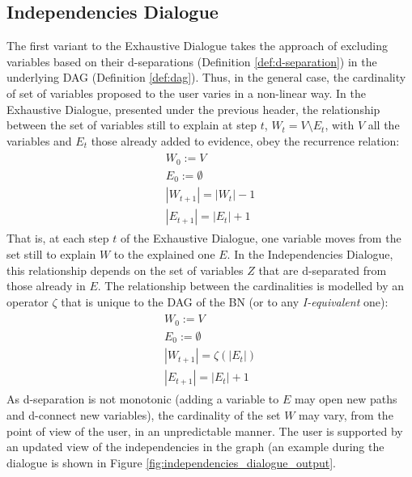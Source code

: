 \subsection{Independencies Dialogue} \label{subsec:results-independencies-dialogue}
The first variant to the Exhaustive Dialogue takes the approach of excluding variables based on their d-separations (Definition \ref{def:d-separation}) in the underlying DAG (Definition \ref{def:dag}).
Thus, in the general case, the cardinality of set of variables proposed to the user varies in a non-linear way.
In the Exhaustive Dialogue, presented under the previous header, the relationship between the set of variables still to explain at step $t$, $W_t = V \setminus E_t$, with $V$ all the variables and $E_t$ those already added to evidence, obey the recurrence relation:
\begin{align}
\begin{split}
		W_0 := V \\
	E_0 := \emptyset \\
	|W_{t+1}| = |W_t| - 1 \\
	|E_{t+1}| = |E_t| + 1
\end{split}
\end{align}
That is, at each step $t$ of the Exhaustive Dialogue, one variable moves from the set still to explain $W$ to the explained one $E$.
In the Independencies Dialogue, this relationship depends on the set of variables $Z$ that are d-separated from those already in $E$.
The relationship between the cardinalities is modelled by an operator $\zeta$ that is unique to the DAG of the BN (or to any \textit{I-equivalent} one):
\begin{align}
\begin{split}
	W_0 := V \\
	E_0 := \emptyset \\
	|W_{t+1}| = \zeta(|E_t|) \\
	|E_{t+1}| = |E_t| + 1
\end{split}
\end{align}
As d-separation is not monotonic (adding a variable to $E$ may open new paths and d-connect new variables), the cardinality of the set $W$ may vary, from the point of view of the user, in an unpredictable manner.
The user is supported by an updated view of the independencies in the graph (an example during the dialogue is shown in Figure \ref{fig:independencies_dialogue_output}.

